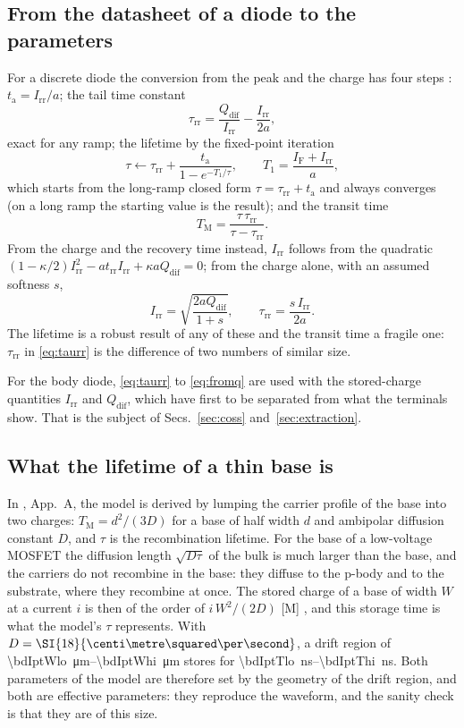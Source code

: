 \documentclass[10pt,a4paper]{scrartcl}
\newcommand{\IF}{I_\mathrm{F}}
\newcommand{\Irr}{I_\mathrm{rr}}
\newcommand{\Qdif}{Q_\mathrm{dif}}
\newcommand{\trr}{t_\mathrm{rr}}
\newcommand{\ta}{t_\mathrm{a}}
\newcommand{\taurr}{\tau_\mathrm{rr}}
\newcommand{\TM}{T_\mathrm{M}}
\newcommand{\Tone}{T_1}
\begin{document}
\subsection{From the datasheet of a diode to the parameters}
\label{sec:invdiode}
For a discrete diode the conversion from the peak and the charge has four steps \cite{lmnote}: $\ta = \Irr/a$; the tail time constant
\begin{equation}
\taurr = \frac{\Qdif}{\Irr} - \frac{\Irr}{2a} ,
\label{eq:taurr}
\end{equation}
exact for any ramp; the lifetime by the fixed-point iteration
\begin{equation}
\tau \leftarrow \taurr + \frac{\ta}{1 - e^{-\Tone/\tau}} , \qquad \Tone = \frac{\IF+\Irr}{a} ,
\label{eq:iter}
\end{equation}
which starts from the long-ramp closed form $\tau = \taurr + \ta$ and always converges (on a long ramp the starting value is the result); and the transit time
\begin{equation}
\TM = \frac{\tau\,\taurr}{\tau - \taurr} .
\label{eq:tm}
\end{equation}
From the charge and the recovery time instead, $\Irr$ follows from the quadratic $(1-\kappa/2)\Irr^2 - a\trr\Irr + \kappa a\Qdif = 0$; from the charge alone, with an assumed softness $s$,
\begin{equation}
\Irr = \sqrt{\frac{2a\Qdif}{1+s}} , \qquad \taurr = \frac{s\,\Irr}{2a} .
\label{eq:fromq}
\end{equation}
The lifetime is a robust result of any of these and the transit time a fragile one: $\taurr$ in \eqref{eq:taurr} is the difference of two numbers of similar size.

For the body diode, \eqref{eq:taurr} to \eqref{eq:fromq} are used with the stored-charge quantities $\Irr$ and $\Qdif$, which have first to be separated from what the terminals show. That is the subject of Secs.~\ref{sec:coss} and~\ref{sec:extraction}.

\subsection{What the lifetime of a thin base is}
\label{sec:thinbase}
In \cite{lmnote}, App.~A, the model is derived by lumping the carrier profile of the base into two charges: $\TM = d^2/(3D)$ for a base of half width $d$ and ambipolar diffusion constant $D$, and $\tau$ is the recombination lifetime. For the base of a low-voltage MOSFET the diffusion length $\sqrt{D\tau}$ of the bulk is much larger than the base, and the carriers do not recombine in the base: they diffuse to the p-body and to the substrate, where they recombine at once. The stored charge of a base of width $W$ at a current $i$ is then of the order of $i\,W^2/(2D)$ [M] \cite{lutz}, and this storage time is what the model's $\tau$ represents. With $D = \SI{\bdIptDcm}{\centi\metre\squared\per\second}$, a drift region of \SIrange{\bdIptWlo}{\bdIptWhi}{\micro\metre} stores for \SIrange{\bdIptTlo}{\bdIptThi}{\nano\second}. Both parameters of the model are therefore set by the geometry of the drift region, and both are effective parameters: they reproduce the waveform, and the sanity check is that they are of this size.
\end{document}
